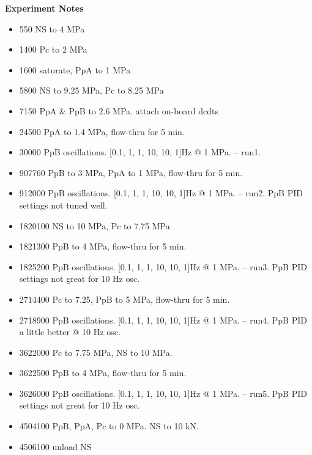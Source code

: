 \documentclass[letterpaper, 10pt]{article}
\begin{document}
\newpage 
 \textbf{Experiment Notes}
 \medskip
 {\small \begin{itemize}[label=\#]
 \setlength\itemsep{0.25em}
 	 \item 550 NS to 4 MPa
 	 \item 1400 Pc to 2 MPa
 	 \item 1600 saturate, PpA to 1 MPa
 	 \item 5800 NS to 9.25 MPa, Pc to 8.25 MPa
 	 \item 7150 PpA \& PpB to 2.6 MPa. attach on-board dcdts
 	 \item 24500 PpA to 1.4 MPa, flow-thru for 5 min. 
 	 \item 30000 PpB oscillations. [0.1, 1, 1, 10, 10, 1]Hz @ 1 MPa. -- run1.
 	 \item 907760 PpB to 3 MPa, PpA to 1 MPa, flow-thru for 5 min.
 	 \item 912000 PpB oscillations. [0.1, 1, 1, 10, 10, 1]Hz @ 1 MPa. -- run2. PpB PID settings not tuned well.
 	 \item 1820100 NS to 10 MPa, Pc to 7.75 MPa 
 	 \item 1821300 PpB to 4 MPa, flow-thru for 5 min.
 	 \item 1825200 PpB oscillations. [0.1, 1, 1, 10, 10, 1]Hz @ 1 MPa. -- run3. PpB PID settings not great for 10 Hz osc.
 	 \item 2714400 Pc to 7.25, PpB to 5 MPa, flow-thru for 5 min.
 	 \item 2718900 PpB oscillations. [0.1, 1, 1, 10, 10, 1]Hz @ 1 MPa. -- run4. PpB PID a little better @ 10 Hz osc.
 	 \item 3622000 Pc to 7.75 MPa, NS to 10 MPa. 
 	 \item 3622500 PpB to 4 MPa, flow-thru for 5 min.
 	 \item 3626000 PpB oscillations. [0.1, 1, 1, 10, 10, 1]Hz @ 1 MPa. -- run5. PpB PID settings not great for 10 Hz osc.
 	 \item 4504100 PpB, PpA, Pc to 0 MPa. NS to 10 kN.
 	 \item 4506100 unload NS
 \end{itemize}} 

 
\end{document}
